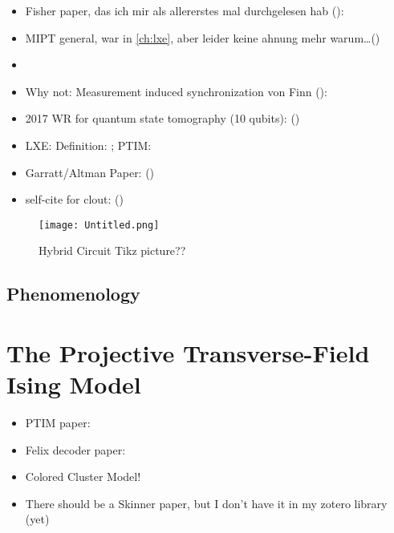 \begin{itemize}
  \item Fisher paper, das ich mir als allererstes mal durchgelesen hab
    ():
    \cite{liMeasurementdrivenEntanglementTransition2019}
  \item MIPT general, war in \cref{ch:lxe}, aber leider keine ahnung mehr
    warum\ldots () \cite{baoTheoryPhaseTransition2020}
  \item {}
    \cite{baoSymmetryEnrichedPhases2021}
  \item Why not: Measurement induced synchronization von Finn
    ():
    \cite{schmolkeMeasurementinducedQuantumSynchronization2023}
  \item 2017 WR for quantum state tomography (10 qubits):
    ()
    \cite{song10QubitEntanglementParallel2017}
  \item LXE: Definition: \cite{liCrossEntropyBenchmark2023}; PTIM:
    \cite{tikhanovskayaUniversalityCrossEntropy2023}
  \item Garratt/Altman Paper:
    () \cite{garrattProbingPostmeasurementEntanglement2023}
  \item self-cite for clout:
    ()
    \cite{schmolkeBoostingInformationTransfer2024}
\end{itemize}
\begin{figure}[H]
  \centering
  \texttt{[image: Untitled.png]}
  \caption{Hybrid Circuit Tikz picture??}
  \label{fig:hybrid-circuit}
\end{figure}

\subsection{Phenomenology}

\section{The Projective Transverse-Field Ising Model}
\begin{itemize}
  \item PTIM paper: 
    \cite{langEntanglementTransitionProjective2020}
  \item Felix decoder paper: 
    \cite{roserDecodingProjectiveTransverse2023}
  \item Colored Cluster Model!
  \item There should be a Skinner paper, but I don't have it in my zotero
    library (yet)
\end{itemize}

